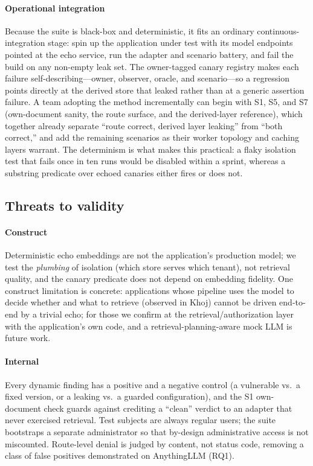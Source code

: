 \IfFileExists{IEEEtran.cls}{\documentclass[conference]{IEEEtran}}{\documentclass[10pt,twocolumn]{article}}
\begin{document}
\paragraph{Operational integration}
Because the suite is black-box and deterministic, it fits an ordinary continuous-integration stage:
spin up the application under test with its model endpoints pointed at the echo service, run the
adapter and scenario battery, and fail the build on any non-empty leak set. The owner-tagged canary
registry makes each failure self-describing---owner, observer, oracle, and scenario---so a
regression points directly at the derived store that leaked rather than at a generic assertion
failure. A team adopting the method incrementally can begin with S1, S5, and S7 (own-document
sanity, the route surface, and the derived-layer reference), which together already separate ``route
correct, derived layer leaking'' from ``both correct,'' and add the remaining scenarios as their
worker topology and caching layers warrant. The determinism is what makes this practical: a
flaky isolation test that fails once in ten runs would be disabled within a sprint, whereas a
substring predicate over echoed canaries either fires or does not.

\subsection{Threats to validity}
\label{sec:threats}
\paragraph{Construct}
Deterministic echo embeddings are not the application's production model; we test the \emph{plumbing}
of isolation (which store serves which tenant), not retrieval quality, and the canary predicate does
not depend on embedding fidelity. One construct limitation is concrete: applications whose pipeline
uses the model to decide whether and what to retrieve (observed in Khoj) cannot be driven end-to-end
by a trivial echo; for those we confirm at the retrieval/authorization layer with the application's
own code, and a retrieval-planning-aware mock LLM is future work.

\paragraph{Internal}
Every dynamic finding has a positive and a negative control (a vulnerable vs.\ a fixed version, or a
leaking vs.\ a guarded configuration), and the S1 own-document check guards against crediting a
``clean'' verdict to an adapter that never exercised retrieval. Test subjects are always regular
users; the suite bootstraps a separate administrator so that by-design administrative access is not
miscounted. Route-level denial is judged by content, not status code, removing a class of false
positives demonstrated on AnythingLLM (RQ1).
\end{document}
